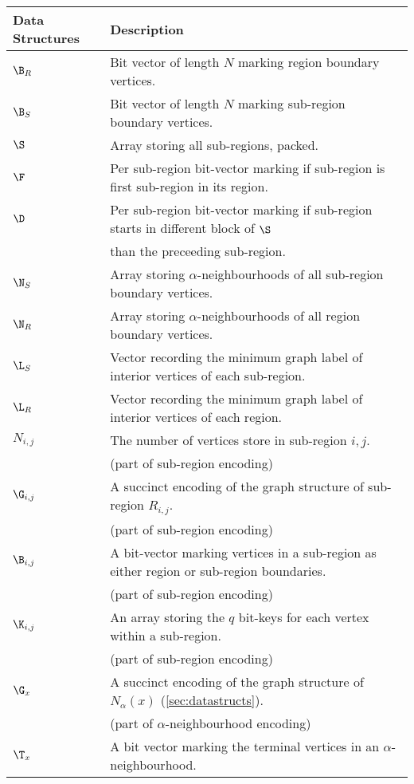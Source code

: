 \begin{table*}[ht]
	\centering
		\begin{tabular}{ l | l}
			Data Structures & Description \\ \hline
			$\B_R$ & Bit vector of length $N$ marking region boundary vertices. \\
			$\B_S$ & Bit vector of length $N$ marking sub-region boundary vertices. \\
			$\S$ & Array storing all sub-regions, packed. \\
			$\F$ & Per sub-region bit-vector marking if sub-region is first sub-region in its region. \\
			$\D$ & Per sub-region bit-vector marking if sub-region starts in different block of $\S$ \\
			& than the preceeding sub-region. \\
			$\N_S$ & Array storing $\alpha$-neighbourhoods of all sub-region boundary vertices. \\
			$\N_R$ & Array storing $\alpha$-neighbourhoods of all region boundary vertices. \\
			$\L_S$ & Vector recording the minimum graph label of interior vertices of each sub-region. \\
			$\L_R$ & Vector recording the minimum graph label of interior vertices of each region. \\
			$N_{i,j}$ & The number of vertices store in sub-region $i,j$. \\
			 & (part of sub-region encoding) \\
			$\G_{i,j}$ & A succinct encoding of the graph structure of sub-region $R_{i,j}$. \\
			 & (part of sub-region encoding) \\
			$\B_{i,j}$ & A bit-vector marking vertices in a sub-region as either region or sub-region boundaries. \\
			 & (part of sub-region encoding) \\
			$\K_{i,j}$ & An array storing the $q$ bit-keys for each vertex within a sub-region. \\
			 & (part of sub-region encoding) \\
			$\G_x$ & A succinct encoding of the graph structure of $N_\alpha(x)$ (\ref{sec:datastructs}). \\
			 & (part of $\alpha$-neighbourhood encoding) \\
			$\T_x$ & A bit vector marking the terminal vertices in an  $\alpha$-neighbourhood. \\

\end{tabular}
\end{table*}
